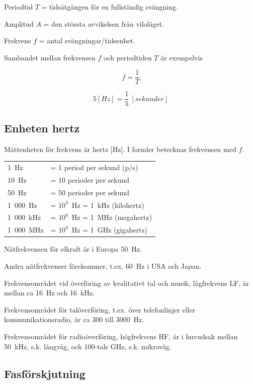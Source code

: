 Periodtid \(T\) = tidsåtgången för en fullständig svängning.

Amplitud \(A\) = den största avvikelsen från viloläget.

Frekvens \(f\) = antal svängningar/tidsenhet.

Sambandet mellan frekvensen \(f\) och periodtiden \(T\) är exempelvis

\[f=\dfrac{1}{T}\] 

\[5 [\unit{Hz}] = \dfrac{1}{5}\ [\unit{sekunder}]\]

\subsection{Enheten hertz}

Måttenheten för frekvens är hertz [Hz].
I formler betecknas frekvensen med \(f\).

\begin{center}
\begin{tabular}{ll}
1~Hz      & = 1 period per sekund (p/s) \\
10~Hz     & = 10 perioder per sekund \\
50~Hz     & = 50 perioder per sekund \\
1~000~Hz  & = \(10^3\)~Hz = 1~kHz (kilohertz) \\
1~000~kHz & = \(10^6\)~Hz = 1~MHz (megahertz) \\
1~000~MHz & = \(10^9\)~Hz = 1~GHz (gigahertz) \\
\end{tabular}
\end{center}

Nätfrekvensen för elkraft är i Europa 50~Hz.

Andra nätfrekvenser förekommer, t.ex. 60~Hz i USA och Japan.

Frekvensområdet vid överföring av kvalitativt tal och musik, lågfrekvens LF, är
mellan ca 16~Hz och 16~kHz.

Frekvensområdet för talöverföring, t.ex. över telefonlinjer eller
kommunikationsradio, är ca 300 till 3000~Hz.

Frekvensområdet för radioöverföring, högfrekvens HF, är i huvudsak mellan
50~kHz, s.k. långvåg, och 100-tals GHz, s.k. mikrovåg.

\subsection{Fasförskjutning}


